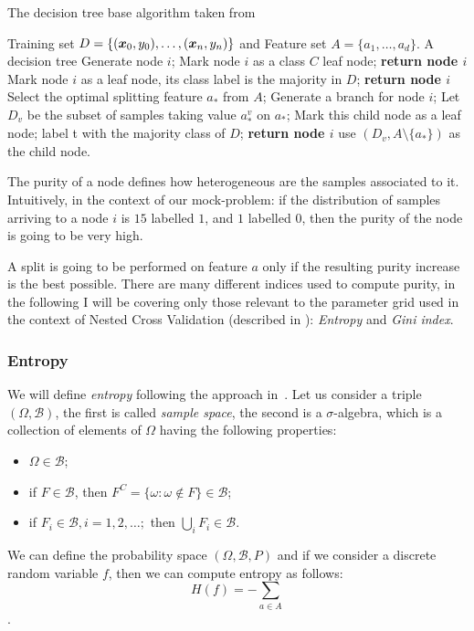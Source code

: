 \begin{algorithm}
	\caption{The decision tree base algorithm taken from
		\cite{ZhouZhi-Hua2021ML}}\label{algo:decision-tree}
	\begin{algorithmic}[1]
		\Require Training set $D = \{(\boldsymbol{x}_0, y_0), \allowbreak\ldots\allowbreak, (\boldsymbol{x}_n, y_n)\}$ and Feature set $A = \{a_1, \ldots,
			a_d\}$.
		\Ensure A decision tree
		\State Generate node $i$;
		\State Mark node $i$ as a class $C$ leaf node; \textbf{return node $i$}
		\EndIf
		\State Mark node $i$ as a leaf node, its class label is
		the majority in $D$;
		\State \textbf{return node $i$}
		\EndIf
		\State Select the optimal splitting feature $a_*$ from $A$;
		\State Generate a branch for node $i$;
		\State Let $D_v$ be the subset of samples taking value $a_*^v$ on $a_*$;
		\State Mark this child node as a leaf node;
		\State label t with the majority class of $D$;
		\textbf{return node $i$}
		\Else
		\State use $(D_v, A \setminus \{a_*\})$ as the child node.
		\EndIf
		\EndFor
		\EndFunction
	\end{algorithmic}
\end{algorithm}

The purity of a node defines how heterogeneous are the samples associated to it. Intuitively, in the
context of our mock-problem: if the distribution of samples arriving to a node $i$ is $15$ labelled
$1$, and $1$ labelled $0$, then the purity of the node is going to be very high.

A split is going to be performed on feature $a$ only if the resulting purity increase is the best
possible. There are many different indices used to compute purity, in the following I will be
covering only those relevant to the parameter grid used in the context of Nested Cross Validation
(described in ): \emph{Entropy} and \emph{Gini index}.

\subsubsection{Entropy}
We will define \emph{entropy} following the approach in~\cite{gray2011entropy}. Let us consider a
triple $(\Omega, \mathcal{B})$, the first is called \emph{sample space}, the second is a $\sigma$-algebra, which is a collection of elements of $\Omega$ having the following properties:
\begin{itemize}
	\item $\Omega \in \mathcal{B}$;
	\item if $F \in \mathcal{B}$, then $F^C = \{\omega: \omega \notin F\} \in \mathcal{B}$;
	\item if $F_i \in \mathcal{B}, i = 1, 2, \ldots;$ then $\bigcup_i{F_i} \in \mathcal{B}$.
\end{itemize}
We can define the probability space $(\Omega, \mathcal{B}, P)$ and if we consider a discrete random
variable $f$, then we can compute entropy as follows: \[H(f) = - \sum_{a \in A}\].



